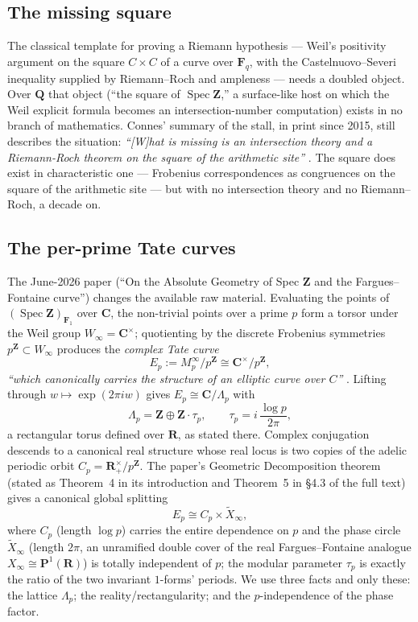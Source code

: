 \documentclass[11pt]{article}
\theoremstyle{definition}
\theoremstyle{remark}
\newcommand{\Z}{\mathbf{Z}}
\newcommand{\Q}{\mathbf{Q}}
\newcommand{\R}{\mathbf{R}}
\newcommand{\C}{\mathbf{C}}
\newcommand{\Fun}{\mathbf{F}_1}
\newcommand{\SpecZ}{\operatorname{Spec}\Z}
\begin{document}
\subsection{The missing square}
\label{sec:missingsquare}

The classical template for proving a Riemann hypothesis --- Weil's positivity
argument on the square $C \times C$ of a curve over $\mathbf{F}_q$, with the
Castelnuovo--Severi inequality supplied by Riemann--Roch and ampleness ---
needs a doubled object. Over $\Q$ that object (``the square of $\SpecZ$,'' a
surface-like host on which the Weil explicit formula becomes an
intersection-number computation) exists in no branch of mathematics. Connes'
summary of the stall, in print since 2015, still describes the situation:
\emph{``[W]hat is missing is an intersection theory and a Riemann-Roch
theorem on the square of the arithmetic site''} \cite[\S4.3.2]{CE15}. The
square does exist in characteristic one --- Frobenius correspondences as
congruences on the square of the arithmetic site \cite{CC16} --- but with no
intersection theory and no Riemann--Roch, a decade on.

\subsection{The per-prime Tate curves}
\label{sec:tatecurves}

The June-2026 paper \cite{CC26} (``On the Absolute Geometry of Spec $\Z$ and
the Fargues--Fontaine curve'') changes the available raw material. Evaluating
the points of $(\SpecZ)_{\Fun}$ over $\C$, the non-trivial points over a
prime $p$ form a torsor under the Weil group $W_\infty = \C^\times$;
quotienting by the discrete Frobenius symmetries $p^\Z \subset W_\infty$
produces the \emph{complex Tate curve}
\[
E_p := M_p^\infty / p^\Z \cong \C^\times / p^\Z ,
\]
\emph{``which canonically carries the structure of an elliptic curve over
$C$''} \cite[eq.~(4) and \S4.1.2]{CC26}. Lifting through
$w \mapsto \exp(2\pi i w)$ gives $E_p \cong \C/\Lambda_p$ with
\[
\Lambda_p = \Z \oplus \Z\cdot\tau_p , \qquad \tau_p = i\,\frac{\log p}{2\pi} ,
\]
a rectangular torus defined over $\R$, as stated there. Complex
conjugation descends to a canonical real structure whose real locus is two
copies of the adelic periodic orbit $C_p = \R^\times_{+}/p^\Z$. The paper's
Geometric Decomposition theorem (stated as Theorem~4 in its introduction and
Theorem~5 in \S4.3 of the full text) gives a canonical global splitting
\[
E_p \cong C_p \times \widetilde{X}_\infty ,
\]
where $C_p$ (length $\log p$) carries the entire dependence on $p$ and the
phase circle $\widetilde{X}_\infty$ (length $2\pi$, an unramified double
cover of the real Fargues--Fontaine analogue $X_\infty \cong \mathbf{P}^1(\R)$)
is totally independent of $p$; the modular parameter $\tau_p$ is
exactly the ratio of the two invariant $1$-forms' periods. We use three facts
and only these: the lattice $\Lambda_p$; the reality/rectangularity; and the
$p$-independence of the phase factor.
\end{document}
